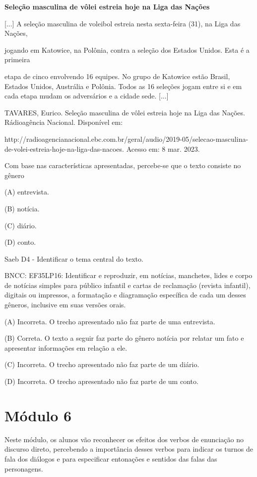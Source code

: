 \begin{itemize}
{{{\begin{itemize}
\begin{itemize}
\begin{itemize}
\textbf{Seleção masculina de vôlei estreia hoje na Liga das Nações}

{[}...{]} A seleção masculina de voleibol estreia nesta sexta-feira
(31), na Liga das Nações,

jogando em Katowice, na Polônia, contra a seleção dos Estados Unidos.
Esta é a primeira

etapa de cinco envolvendo 16 equipes. No grupo de Katowice estão Brasil,
Estados Unidos, Austrália e Polônia. Todos as 16 seleções jogam entre si
e em cada etapa mudam os adversários e a cidade sede. {[}...{]}

TAVARES, Eurico. Seleção masculina de vôlei estreia hoje na Liga das
Nações. Rádioagência Nacional. Disponível em:

http://radioagencianacional.ebc.com.br/geral/audio/2019-05/selecao-masculina-de-volei-estreia-hoje-na-liga-das-nacoes.
Acesso em: 8 mar. 2023.

Com base nas características apresentadas, percebe-se que o texto
consiste no gênero

(A) entrevista.

(B) notícia.

(C) diário.

(D) conto.

Saeb D4 - Identificar o tema central do texto.

BNCC: EF35LP16: Identificar e reproduzir, em notícias, manchetes, lides
e corpo de notícias simples para público infantil e cartas de reclamação
(revista infantil), digitais ou impressos, a formatação e diagramação
específica de cada um desses gêneros, inclusive em suas versões orais.

(A) Incorreta. O trecho apresentado não faz parte de uma entrevista.

(B) Correta. O texto a seguir faz parte do gênero notícia por relatar um
fato e apresentar informações em relação a ele.

(C) Incorreta. O trecho apresentado não faz parte de um diário.

(D) Incorreta. O trecho apresentado não faz parte de um conto.

\chapter{Módulo 6}

Neste módulo, os alunos vão reconhecer os efeitos dos verbos de
enunciação no discurso direto, percebendo a importância desses verbos
para indicar os turnos de fala dos diálogos e para especificar
entonações e sentidos das falas das personagens.


\end{itemize}
\end{itemize}
\end{itemize}}}}
\end{itemize}
